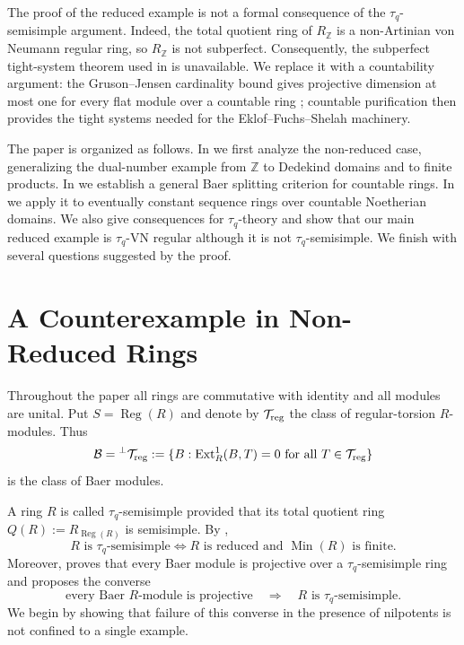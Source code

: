 \documentclass[11pt]{article}
\theoremstyle{definition}
\theoremstyle{remark}
\newcommand{\Reg}{\operatorname{Reg}}
\newcommand{\Min}{\operatorname{Min}}
\newcommand{\Ext}{\operatorname{Ext}}
\newcommand{\B}{\mathcal B}
\newcommand{\Tors}{\mathcal T_{\rm reg}}
\begin{document}
The proof of the reduced example is not a formal consequence of the
$\tau_q$-semisimple argument.  Indeed, the total quotient ring of
$R_{\mathbb Z}$ is a non-Artinian von Neumann regular ring, so
$R_{\mathbb Z}$ is not subperfect.  Consequently, the subperfect tight-system
theorem used in \cite{ZKBaer} is unavailable.  We replace it with a
countability argument: the Gruson--Jensen cardinality bound gives projective
dimension at most one for every flat module over a countable ring
\cite{GrusonJensen}; countable purification then provides the tight systems
needed for the Eklof--Fuchs--Shelah machinery.

The paper is organized as follows.  In  we first analyze the
non-reduced case, generalizing the dual-number example from $\mathbb Z$ to
Dedekind domains and to finite products.  In  we establish
a general Baer splitting criterion for countable rings.  In  we
apply it to eventually constant sequence rings over countable Noetherian
domains.  We also give consequences for $\tau_q$-theory and show that our main
reduced example is $\tau_q$-VN regular although it is not
$\tau_q$-semisimple.  We finish with several questions suggested by the proof.

\section{A Counterexample in Non-Reduced Rings}\label{sec:prelim}

Throughout the paper all rings are commutative with identity and all modules
are unital.  Put $S=\Reg(R)$ and denote by $\Tors$ the class of
regular-torsion $R$-modules.  Thus
\[
 \B={}^\perp\Tors
 :=\{B:\Ext_R^1(B,T)=0\text{ for all }T\in\Tors\}
\]
is the class of Baer modules.

A ring $R$ is called $\tau_q$-semisimple provided that its total quotient ring
$Q(R):=R_{\Reg(R)}$ is semisimple.  By \cite{Ztauq},
\begin{equation}\label{eq:tauq-char-prelim}
 R\text{ is $\tau_q$-semisimple}
 \iff
 R\text{ is reduced and }\Min(R)\text{ is finite}.
\end{equation}
Moreover, \cite{ZKBaer} proves that every Baer module is projective over a
$\tau_q$-semisimple ring and proposes the converse
\begin{equation}\label{eq:conjecture-prelim}
 \text{every Baer $R$-module is projective}
 \quad\Longrightarrow\quad
 R\text{ is $\tau_q$-semisimple}.
\end{equation}
We begin by showing that failure of this converse in the presence of
nilpotents is not confined to a single example.
\end{document}

